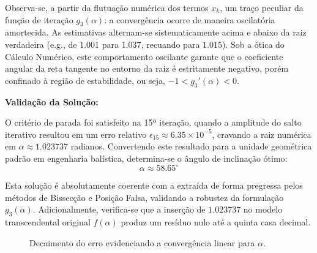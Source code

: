 Observa-se, a partir da flutuação numérica dos termos $x_k$, um traço peculiar da função de iteração $g_3(\alpha)$: a convergência ocorre de maneira oscilatória amortecida. As estimativas alternam-se sistematicamente acima e abaixo da raiz verdadeira (e.g., de $1.001$ para $1.037$, recuando para $1.015$). Sob a ótica do Cálculo Numérico, este comportamento oscilante garante que o coeficiente angular da reta tangente no entorno da raiz é estritamente negativo, porém confinado à região de estabilidade, ou seja, $-1 < g_3'(\alpha) < 0$.

\textbf{Validação da Solução:}

O critério de parada foi satisfeito na 15ª iteração, quando a amplitude do salto iterativo resultou em um erro relativo $\epsilon_{15} \approx 6.35 \times 10^{-5}$, cravando a raiz numérica em $\alpha \approx 1.023737$ radianos. Convertendo este resultado para a unidade geométrica padrão em engenharia balística, determina-se o ângulo de inclinação ótimo:
\begin{equation}
    \alpha \approx 58.65^\circ
\end{equation}

Esta solução é absolutamente coerente com a extraída de forma pregressa pelos métodos de Bissecção e Posição Falsa, validando a robustez da formulação $g_3(\alpha)$. Adicionalmente, verifica-se que a inserção de $1.023737$ no modelo transcendental original $f(\alpha)$ produz um resíduo nulo até a quinta casa decimal.

\begin{figure}[H]
    \centering
    \caption{Decaimento do erro evidenciando a convergência linear para $\alpha$.}
    \label{fig:convergencia_ponto_fixo_missil}
\end{figure}

